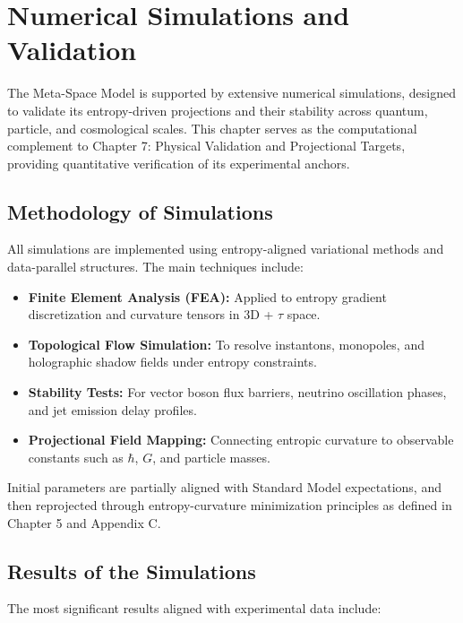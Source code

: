 \documentclass[10.5pt,a4paper]{article}
\begin{document}
\clearpage

\section{Numerical Simulations and Validation}

The Meta-Space Model is supported by extensive numerical simulations, designed to validate its entropy-driven projections and their stability across quantum, particle, and cosmological scales. This chapter serves as the computational complement to Chapter 7: Physical Validation and Projectional Targets, providing quantitative verification of its experimental anchors.

\subsection{Methodology of Simulations}

All simulations are implemented using entropy-aligned variational methods and data-parallel structures. The main techniques include:

\begin{itemize}
  \item \textbf{Finite Element Analysis (FEA):} Applied to entropy gradient discretization and curvature tensors in 3D + \(\tau\) space.
  \item \textbf{Topological Flow Simulation:} To resolve instantons, monopoles, and holographic shadow fields under entropy constraints.
  \item \textbf{Stability Tests:} For vector boson flux barriers, neutrino oscillation phases, and jet emission delay profiles.
  \item \textbf{Projectional Field Mapping:} Connecting entropic curvature to observable constants such as \(\hbar\), \(G\), and particle masses.
\end{itemize}

Initial parameters are partially aligned with Standard Model expectations, and then reprojected through entropy-curvature minimization principles as defined in Chapter 5 and Appendix C.

\subsection{Results of the Simulations}

The most significant results aligned with experimental data include:
\end{document}
